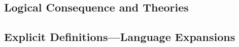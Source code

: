 

\subsection{Logical Consequence and Theories}



\subsection{Explicit Definitions---Language Expansions}



\vfill\break

\index

\bye

